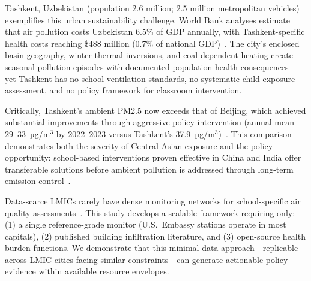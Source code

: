 \documentclass[11pt,a4paper]{article}
\begin{document}
Tashkent, Uzbekistan (population 2.6 million; 2.5 million metropolitan vehicles) exemplifies this urban sustainability challenge. World Bank analyses estimate that air pollution costs Uzbekistan 6.5\% of GDP annually, with Tashkent-specific health costs reaching \$488 million (0.7\% of national GDP)~\cite{worldbank2024uzbekistan,unece2024uzbekistan}. The city's enclosed basin geography, winter thermal inversions, and coal-dependent heating create seasonal pollution episodes with documented population-health consequences~\cite{ashuraliyev2025pm25tashkent}---yet Tashkent has no school ventilation standards, no systematic child-exposure assessment, and no policy framework for classroom intervention.

Critically, Tashkent's ambient PM2.5 now exceeds that of Beijing, which achieved substantial improvements through aggressive policy intervention (annual mean 29--33~µg/m$^3$ by 2022--2023 versus Tashkent's 37.9~µg/m$^3$)~\cite{crea2023china}. This comparison demonstrates both the severity of Central Asian exposure and the policy opportunity: school-based interventions proven effective in China and India offer transferable solutions before ambient pollution is addressed through long-term emission control~\cite{landrigan2017lancet,khreis2017exposure}.

Data-scarce LMICs rarely have dense monitoring networks for school-specific air quality assessments~\cite{cohen2017estimates}. This study develops a scalable framework requiring only: (1) a single reference-grade monitor (U.S.\ Embassy stations operate in most capitals), (2) published building infiltration literature, and (3) open-source health burden functions. We demonstrate that this minimal-data approach---replicable across LMIC cities facing similar constraints---can generate actionable policy evidence within available resource envelopes.
\end{document}
